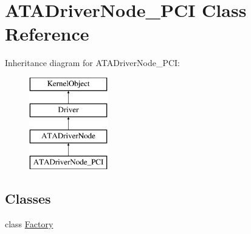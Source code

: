 \hypertarget{class_a_t_a_driver_node___p_c_i}{}\section{A\+T\+A\+Driver\+Node\+\_\+\+P\+CI Class Reference}
\label{class_a_t_a_driver_node___p_c_i}
Inheritance diagram for A\+T\+A\+Driver\+Node\+\_\+\+P\+CI\+:\begin{figure}[H]
\begin{center}
\leavevmode
\includegraphics[height=4.000000cm]{class_a_t_a_driver_node___p_c_i}
\end{center}
\end{figure}
\subsection*{Classes}
\begin{DoxyCompactItemize}
\item 
class \hyperlink{class_a_t_a_driver_node___p_c_i_1_1_factory}{Factory}
\end{DoxyCompactItemize}
